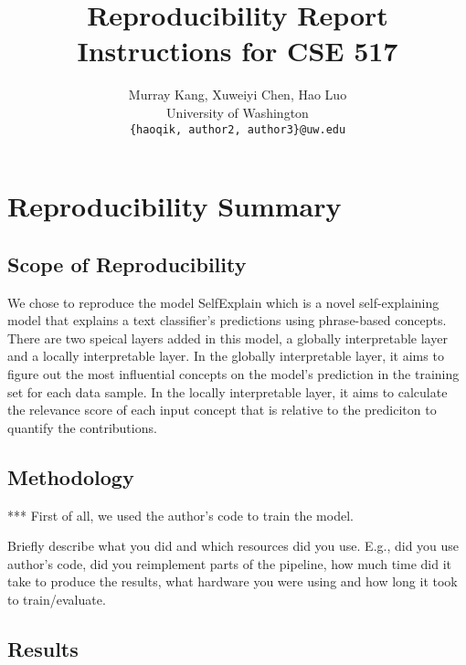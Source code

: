 \documentclass{article}
\title{Reproducibility Report Instructions for CSE 517}
\author{%
  Murray Kang, Xuweiyi Chen, Hao Luo \\ %
  University of Washington \\
 \texttt{\{haoqik, author2, author3\}@uw.edu} \\ %
}
\begin{document}
\maketitle



\section*{\centering Reproducibility Summary}


\subsection*{Scope of Reproducibility}

We chose to reproduce the model SelfExplain which is a novel self-explaining model that explains a text classifier's predictions using phrase-based concepts. There are two speical layers added in this model, a globally interpretable layer and a locally interpretable layer. In the globally interpretable layer, it aims to figure out the most influential concepts on the model's prediction in the training set for each data sample. In the locally interpretable layer, it aims to calculate the relevance score of each input concept that is relative to the prediciton to quantify the contributions.

\subsection*{Methodology}

*** First of all, we used the author's code to train the model. 

Briefly describe what you did and which resources did you use. E.g., did you use author's code, did you reimplement parts of the pipeline, how much time did it take to produce the results, what hardware you were using and how long it took to train/evaluate. 

\subsection*{Results}
\end{document}
